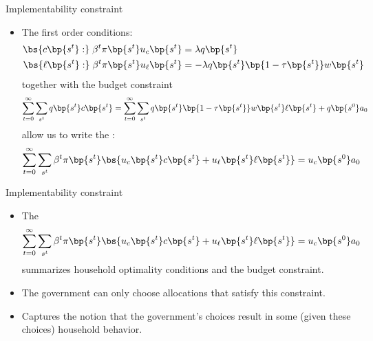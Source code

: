 \documentclass[11pt,xcolor={dvipsnames},hyperref={pdftex,pdfpagemode=UseNone,hidelinks,pdfdisplaydoctitle=true},usepdftitle=false]{beamer}
\begin{document}
\begin{frame}{Implementability constraint}
        \begin{itemize}
            \item The first order conditions:
        \begin{align*}
            \bs{c\bp{s^t}:} \;\beta^t \pi\bp{s^t} u_c \bp{s^t} & =\lambda q\bp{s^t}\\
            \bs{\ell\bp{s^t}:} \;\beta^t \pi\bp{s^t} u_{\ell} \bp{s^t} & =-\lambda q\bp{s^t}\bp{1 - \tau\bp{s^t} }w \bp{s^t}
        \end{align*}
            together with the budget constraint
        \begin{align*}
            \sum_{t=0}^\infty \sum_{s^t}  q\bp{s^t} c\bp{s^t}  =
            \sum_{t=0}^\infty \sum_{s^t}  q\bp{s^t} \bp{1 - \tau\bp{s^t} }w \bp{s^t} \ell\bp{s^t}  + q\bp{s^0}a_0   
        \end{align*}
        allow us to write the :
         \begin{align*}  
            \sum_{t=0}^\infty \sum_{s^t} \beta^t \pi\bp{s^t} \bs{  u_c \bp{s^t} c\bp{s^t}  + u_{\ell} \bp{s^t} \ell\bp{s^t}}  = u_c \bp{s^0} a_0
        \end{align*}
        \end{itemize}
    \end{frame}
    \begin{frame}{Implementability constraint}
        \begin{itemize}
            \item The 
            \begin{align*}  
                \sum_{t=0}^\infty \sum_{s^t} \beta^t  \pi\bp{s^t} \bs{  u_c \bp{s^t} c\bp{s^t}  + u_{\ell} \bp{s^t} \ell\bp{s^t}}  = u_c \bp{s^0} a_0
            \end{align*}
        summarizes household optimality conditions and the budget constraint.
        \item The government can only choose allocations that satisfy this constraint.
        \item Captures the notion that the government's choices result in some  (given these choices) household behavior.
        \end{itemize}
    \end{frame}
    
\end{document}
